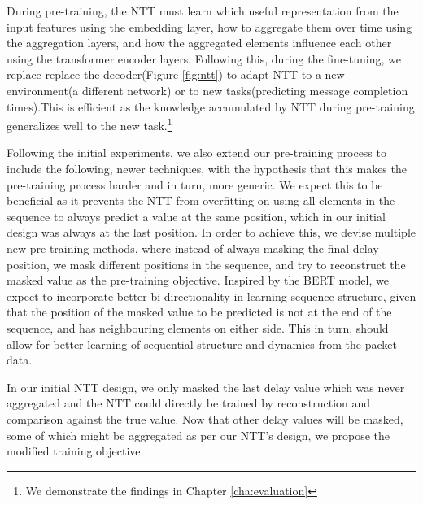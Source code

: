 During pre-training, the NTT must learn which useful representation from the input features using the embedding layer, how to aggregate them over time using the aggregation layers, and how the aggregated elements influence each other using the transformer encoder layers. Following this, during the fine-tuning, we replace replace the decoder(Figure \ref{fig:ntt}) to adapt NTT to a new environment(\eg a different network) or to new tasks(\eg predicting message completion times).This is efficient as the knowledge accumulated by NTT during pre-training generalizes well to the new task.\footnote{We demonstrate the findings in Chapter \ref{cha:evaluation}}

Following the initial experiments, we also extend our pre-training process to include the following, newer techniques, with the hypothesis that this makes the pre-training process harder and in turn, more generic. We expect this to be beneficial as it prevents the NTT from overfitting on using all elements in the sequence to always predict a value at the same position, which in our initial design was always at the last position. In order to achieve this, we devise multiple new pre-training methods, where instead of always masking the final delay position, we mask different positions in the sequence, and try to reconstruct the masked value as the pre-training objective. Inspired by the BERT\cite{devlinBERTPretrainingDeep2019} model, we expect to incorporate better bi-directionality in learning sequence structure, given that the position of the masked value to be predicted is not at the end of the sequence, and has neighbouring elements on either side. This in turn, should allow for better learning of sequential structure and dynamics from the packet data.

In our initial NTT design, we only masked the last delay value which was never aggregated and the NTT could directly be trained by reconstruction and comparison against the true value. Now that other delay values will be masked, some of which might be aggregated as per our NTT's design, we propose the modified training objective.

